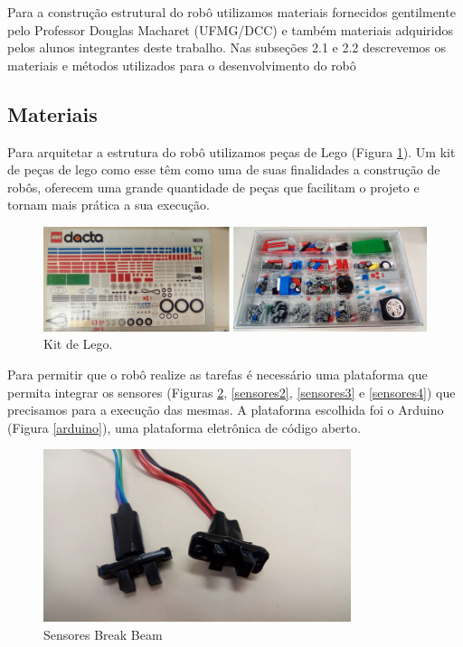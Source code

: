 Para a construção estrutural do robô utilizamos materiais fornecidos gentilmente pelo Professor Douglas Macharet (UFMG/DCC) e também materiais adquiridos pelos alunos integrantes deste trabalho. Nas subseções 2.1 e 2.2 descrevemos os materiais e métodos utilizados para o desenvolvimento do robô

\subsection{Materiais}

Para arquitetar a estrutura do robô utilizamos peças de Lego (Figura \ref{lego1}). Um kit de peças de lego como esse têm como uma de suas finalidades a construção de robôs, oferecem uma grande quantidade de peças que facilitam o projeto e tornam mais prática a sua execução.

\begin{figure}[!htb]
	\centering
	\includegraphics[width=12.5cm]{images/lego1.png}
	\caption{Kit de Lego.}
	\label{lego1}
\end{figure}

Para permitir que o robô realize as tarefas é necessário uma plataforma que permita integrar os sensores (Figuras \ref{sensores1}, \ref{sensores2}, \ref{sensores3} e \ref{sensores4}) que precisamos para a execução das mesmas. A plataforma escolhida foi o Arduino (Figura \ref*{arduino}), uma plataforma eletrônica de código aberto.


\begin{figure}[!htb]
	\centering
	\includegraphics[width=9cm]{images/sensores1.png}
	\caption{Sensores Break Beam}
	\label{sensores1}
\end{figure}


